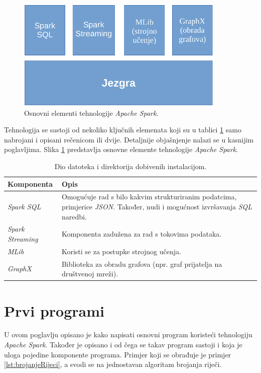 \documentclass[times, utf8, zavrsni, numeric]{fer}
\begin{document}
\begin{figure}[htb]
\centering
\includegraphics[width=10cm]{img/gradivniElementiCropped.pdf}
\caption{Osnovni elementi tehnologije \emph{Apache Spark}.}
\label{fig:spark-stack}
\end{figure}
\pagebreak
Tehnologija se sastoji od nekoliko ključnih elemenata koji su u tablici \ref{tbl:gradivniElementi} samo nabrojani i opisani rečenicom ili dvije. Detaljnije objašnjenje nalazi se u kasnijim poglavljima. Slika \ref{fig:spark-stack} predstavlja osnovne elemente tehnologije \emph{Apache Spark}.

\begin{table}[htb]
\caption{Dio datoteka i direktorija dobivenih instalacijom.}
\label{tbl:gradivniElementi}
\centering
\begin{tabular}{l p{8cm}}
\hline
Komponenta & Opis \\
\hline
\emph{Spark SQL} & Omogućuje rad s bilo kakvim strukturiranim podatcima, primjerice \emph{JSON}. Također, nudi i mogućnost izvršavanja \emph{SQL} naredbi. \\
\emph{Spark Streaming} & Komponenta zadužena za rad s tokovima podataka. \\
\emph{MLib} & Koristi se za postupke strojnog učenja. \\
\emph{GraphX} & Biblioteka za obradu grafova (npr. graf prijatelja na društvenoj mreži).\\
\hline
\end{tabular}
\end{table}

\chapter{Prvi programi}
U ovom poglavlju opisano je kako napisati osnovni program koristeći tehnologiju \emph{Apache Spark}. Također je opisano i od čega se takav program sastoji i koja je uloga pojedine komponente programa. Primjer koji se obrađuje je primjer \ref{lst:brojanjeRijeci}, a svodi se na jednostavan algoritam brojanja riječi.
\end{document}
